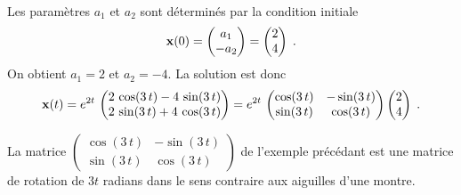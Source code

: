 {\begin{egg}
\begin{align*}
\end{align*}
Les paramètres $a_1$ et $a_2$ sont déterminés par la condition initiale
\[
\mathbf{x}(0) = \begin{pmatrix} a_1 \\ -a_2 \end{pmatrix}
= \begin{pmatrix} 2 \\ 4 \end{pmatrix} \; .
\]
On obtient $a_1=2$ et $a_2=-4$.  La solution est donc
\[
\mathbf{x}(t) = e^{2t}\,
\begin{pmatrix}
2\,\cos(3\,t) - 4\,\sin(3\,t) \\
2\,\sin(3\,t) + 4\,\cos(3\,t)
\end{pmatrix}
= e^{2t}\,
\begin{pmatrix}
\cos(3\,t) & -\sin(3\,t) \\
\sin(3\,t) & \cos(3\,t)
\end{pmatrix}
\begin{pmatrix} 2 \\ 4 \end{pmatrix}
 \; .
\]
\end{egg}

\begin{rmk}
La matrice
$\displaystyle \begin{pmatrix}
\cos(3\,t) & -\sin(3\,t) \\
\sin(3\,t) & \cos(3\,t)
\end{pmatrix}$ de l'exemple précédant est une matrice de rotation de
$3t$ radians dans le sens contraire aux aiguilles d'une montre.
\end{rmk}

}
